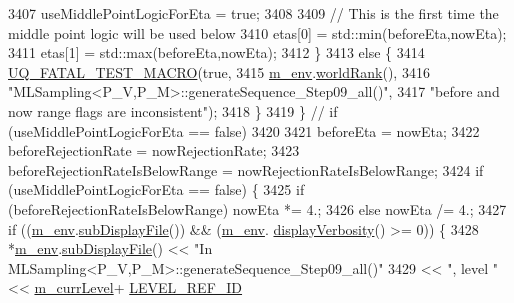 \begin{DoxyCode}
3407                 useMiddlePointLogicForEta = \textcolor{keyword}{true};
3408 
3409                 \textcolor{comment}{// This is the first time the middle point logic will be used below}
3410                 etas[0] = std::min(beforeEta,nowEta);
3411                 etas[1] = std::max(beforeEta,nowEta);
3412               \}
3413               \textcolor{keywordflow}{else} \{
3414                 \hyperlink{_defines_8h_a56d63d18d0a6d45757de47fcc06f574d}{UQ\_FATAL\_TEST\_MACRO}(\textcolor{keyword}{true},
3415                                     \hyperlink{class_q_u_e_s_o_1_1_m_l_sampling_a13f1ca4fe9f94822fe572a743eaced1d}{m\_env}.\hyperlink{class_q_u_e_s_o_1_1_base_environment_a78b57112bbd0e6dd0e8afec00b40ffa7}{worldRank}(),
3416                                     \textcolor{stringliteral}{"MLSampling<P\_V,P\_M>::generateSequence\_Step09\_all()"},
3417                                     \textcolor{stringliteral}{"before and now range flags are inconsistent"});
3418               \}
3419             \} \textcolor{comment}{// if (useMiddlePointLogicForEta == false)}
3420 
3421             beforeEta                       = nowEta;
3422             beforeRejectionRate             = nowRejectionRate;
3423             beforeRejectionRateIsBelowRange = nowRejectionRateIsBelowRange;
3424             \textcolor{keywordflow}{if} (useMiddlePointLogicForEta == \textcolor{keyword}{false}) \{
3425               \textcolor{keywordflow}{if} (beforeRejectionRateIsBelowRange) nowEta *= 4.;
3426               \textcolor{keywordflow}{else}                                 nowEta /= 4.;
3427               \textcolor{keywordflow}{if} ((\hyperlink{class_q_u_e_s_o_1_1_m_l_sampling_a13f1ca4fe9f94822fe572a743eaced1d}{m\_env}.\hyperlink{class_q_u_e_s_o_1_1_base_environment_a8a0064746ae8dddfece4229b9ad374d6}{subDisplayFile}()) && (\hyperlink{class_q_u_e_s_o_1_1_m_l_sampling_a13f1ca4fe9f94822fe572a743eaced1d}{m\_env}.
      \hyperlink{class_q_u_e_s_o_1_1_base_environment_a1fe5f244fc0316a0ab3e37463f108b96}{displayVerbosity}() >= 0)) \{
3428                 *\hyperlink{class_q_u_e_s_o_1_1_m_l_sampling_a13f1ca4fe9f94822fe572a743eaced1d}{m\_env}.\hyperlink{class_q_u_e_s_o_1_1_base_environment_a8a0064746ae8dddfece4229b9ad374d6}{subDisplayFile}() << \textcolor{stringliteral}{"In
       MLSampling<P\_V,P\_M>::generateSequence\_Step09\_all()"}
3429                                         << \textcolor{stringliteral}{", level "} << \hyperlink{class_q_u_e_s_o_1_1_m_l_sampling_af9416874c856e50f3b35270e801f17e4}{m\_currLevel}+
      \hyperlink{_m_l_sampling_level_options_8h_a68d15eaf394d210effcf584b938206d3}{LEVEL\_REF\_ID}

\end{DoxyCode}
